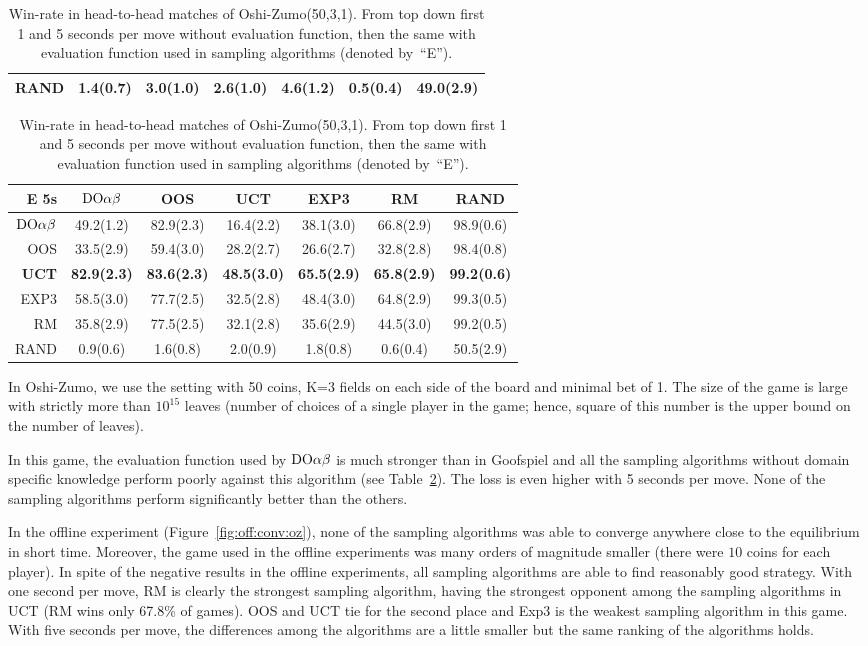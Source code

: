 \begin{table}[t!]
\begin{scriptsize}
\begin{tabular}{|r|cccccc|}
RAND&1.4(0.7)&3.0(1.0)&2.6(1.0)&4.6(1.2)&0.5(0.4)&49.0(2.9)\\
\hline
\end{tabular}
\begin{tabular}{|r|cccccc|}\hline
E 5s&$\textrm{DO}\alpha\beta$&OOS&UCT&EXP3&RM&RAND\\\hline
$\textrm{DO}\alpha\beta$&49.2(1.2)&82.9(2.3)&16.4(2.2)&38.1(3.0)&66.8(2.9)&98.9(0.6)\\
OOS&33.5(2.9)&59.4(3.0)&28.2(2.7)&26.6(2.7)&32.8(2.8)&98.4(0.8)\\
\textbf{UCT}&\textbf{82.9(2.3)}&\textbf{83.6(2.3)}&\textbf{48.5(3.0)}&\textbf{65.5(2.9)}&\textbf{65.8(2.9)}&\textbf{99.2(0.6)}\\
EXP3&58.5(3.0)&77.7(2.5)&32.5(2.8)&48.4(3.0)&64.8(2.9)&99.3(0.5)\\
RM&35.8(2.9)&77.5(2.5)&32.1(2.8)&35.6(2.9)&44.5(3.0)&99.2(0.5)\\
RAND&0.9(0.6)&1.6(0.8)&2.0(0.9)&1.8(0.8)&0.6(0.4)&50.5(2.9)\\
\hline
\end{tabular}

\end{scriptsize}
\caption{Win-rate in head-to-head matches of Oshi-Zumo(50,3,1). From top down first 1 and 5 seconds per move without evaluation function, then the same with evaluation function used in sampling algorithms (denoted by~``E'').}\label{fig:matches:oz}
\end{table}

In Oshi-Zumo, we use the setting with 50 coins, K=3 fields on each side of the board and minimal bet of 1. 
The size of the game is large with strictly more than $10^{15}$ leaves (number of choices of a single player in the game; hence, square of this number is the upper bound on the number of leaves).

In this game, the evaluation function used by $\textrm{DO}\alpha\beta$ is much stronger than in Goofspiel and all the sampling algorithms without domain specific knowledge perform poorly against this algorithm (see Table~\ref{fig:matches:oz}). The loss is even higher with 5 seconds per move. None of the sampling algorithms perform significantly better than the others.

In the offline experiment (Figure~\ref{fig:off:conv:oz}), none of the sampling algorithms was able to converge anywhere close to the equilibrium in short time. Moreover, the game used in the offline experiments was many orders of magnitude smaller (there were $10$ coins for each player). In spite of the negative results in the offline experiments, all sampling algorithms are able to find reasonably good strategy. With one second per move, RM is clearly the strongest sampling algorithm, having the strongest opponent among the sampling algorithms in UCT (RM wins only 67.8\% of games). OOS and UCT tie for the second place and Exp3 is the weakest sampling algorithm in this game. With five seconds per move, the differences among the algorithms are a little smaller but the same ranking of the algorithms holds.

